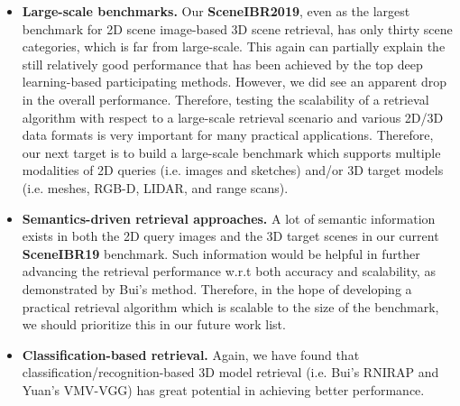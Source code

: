 \documentclass[../main.tex]{subfiles}
\begin{document}
\begin{itemize}
	
	\item \textbf{Large-scale benchmarks.} Our \textbf{SceneIBR2019}, even as 
	the largest benchmark for 2D scene image-based 3D scene retrieval, has only 
	thirty scene categories, which is far from large-scale. This again can 
	partially explain the still relatively good performance that has been 
	achieved by the top deep learning-based participating methods. However, we 
	did see an apparent drop in the overall performance. Therefore, testing the 
	scalability of a retrieval algorithm with respect to a large-scale 
	retrieval scenario and various 2D/3D data formats is very important for 
	many practical applications. Therefore, our next target is to build a 
	large-scale benchmark which supports multiple modalities of 2D queries 
	(i.e. images and sketches) and/or 3D target models (i.e. meshes, RGB-D, 
	LIDAR, and range scans).
	
	\item \textbf{Semantics-driven retrieval approaches.} A lot of semantic information exists in both the 2D query images and the 3D target scenes in our current \textbf{SceneIBR19} benchmark. Such information would be helpful in further advancing the retrieval performance w.r.t both accuracy and scalability, as demonstrated by Bui's method. Therefore, in the hope of developing a practical retrieval algorithm which is scalable to the size of the benchmark, we should prioritize this in our future work list.
	
	\item \textbf{Classification-based retrieval.} Again, we have found that classification/recognition-based 3D model retrieval (i.e. Bui's RNIRAP and Yuan's VMV-VGG) has great potential in achieving better performance.
\end{itemize}
\end{document}
